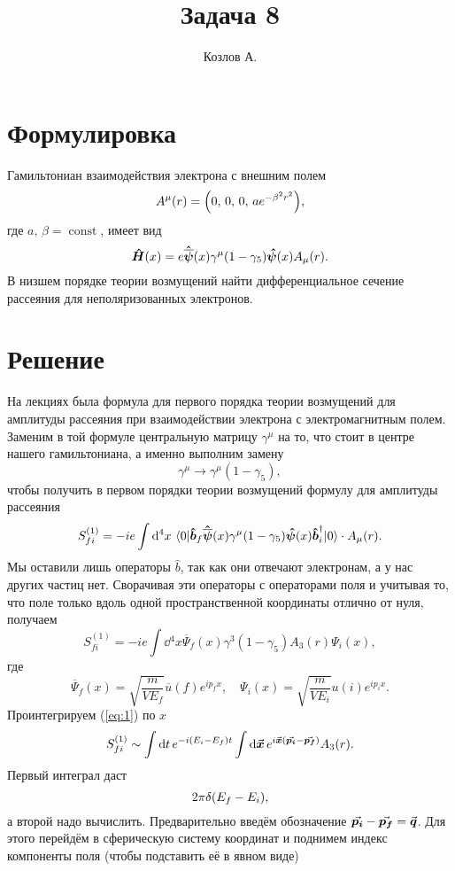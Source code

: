 \documentclass[12pt]{article}
\title{Задача 8}
\author{Козлов А.}
\DeclareMathOperator\const{const}
\begin{document}
	\maketitle	
	\section{Формулировка}
	\label{sec:0}
	Гамильтониан взаимодействия электрона с внешним полем 
	$$A^\mu (r) = \qty(0,\,0,\,0,\,ae^{-\beta^2r^2}),$$
	где $a,\,\beta = \const$, имеет вид
	$$ \vu*{H} (x) = e \vu*{\overline{\psi}}(x) \gamma^\mu (1 - \gamma_5) \vu*{\psi}(x) A_\mu (r).$$
	В низшем порядке теории возмущений найти дифференциальное сечение рассеяния для неполяризованных электронов.

	\section{Решение}
	На лекциях была формула для первого порядка теории возмущений для амплитуды рассеяния при взаимодействии электрона с электромагнитным полем. Заменим в той формуле центральную матрицу $\gamma^\mu$ на то, что стоит в центре нашего гамильтониана, а именно выполним замену
	$$ \gamma^\mu \rightarrow \gamma^\mu (1 - \gamma_5),$$
	чтобы получить в первом порядки теории возмущений формулу для амплитуды рассеяния
	\begin{equation} \label{eq:1}
		S_{fi}^{(1)} = -ie\int \dd{{}^4 x} \ev{\vu*{b}_f \vu*{\overline{\psi}}(x) \gamma^\mu (1 - \gamma_5) \vu*{\psi}(x) \vu*{b}_i^\dag }{0} \cdot A_\mu (r).
	\end{equation}
	Мы оставили лишь операторы $\hat{b}$, так как они отвечают электронам, а у нас других частиц нет. Сворачивая эти операторы с операторами поля и учитывая то, что поле только вдоль одной пространственной координаты отлично от нуля, получаем
	\begin{equation}
		S_{fi}^{(1)} = -ie\int \dd{{}^4 x} \overline{\Psi}_f(x) \gamma^3 (1 - \gamma_5) A_3 (r) \Psi_i(x),
	\end{equation}
	где $$ \overline{\Psi}_f(x) = \sqrt{\dfrac{m}{V E_f}} \overline{u}(f) e^{i p_f x}, \quad \Psi_i(x) = \sqrt{\dfrac{m}{V E_i}} u(i) e^{i p_i x}. $$
	Проинтегрируем (\ref{eq:1}) по $x$
	\begin{equation}\label{eq:3}
		S_{fi}^{(1)} \sim \int \dd{t} e^{-i\qty(E_i - E_f)t} \int\dd{\va*{x}} e^{i\va*{x}(\va*{p_i} - \va*{p_f})} A_3(r).
	\end{equation}
	Первый интеграл даст 
	$$ 2\pi\delta\qty(E_f - E_i), $$
	а второй надо вычислить. Предварительно введём обозначение $\va*{p_i} - \va*{p_f} = \va*{q}$. Для этого перейдём в сферическую систему координат и поднимем индекс компоненты поля (чтобы подставить её в явном виде)
\end{document}
